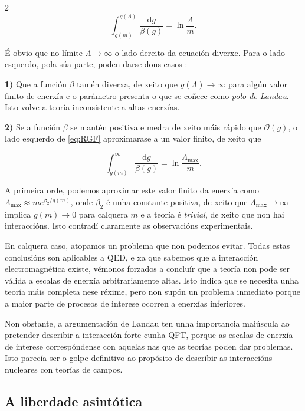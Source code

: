 \begin{multicols}{2}
\begin{equation}
    \int_{g(m)}^{g(\Lambda)} \frac{\text{d}g}{\beta(g)} = \ln \frac{\Lambda}{m}.
    \label{eq:RGF}
\end{equation}

\noindent É obvio que no límite $\Lambda \to \infty$ o lado dereito da ecuación
diverxe. Para o lado esquerdo, pola súa parte, poden darse dous casos \cite{Landau1}:

\textbf{1)} Que a función $\beta$ tamén diverxa, de xeito que $g(\Lambda) \to \infty$ para
algún valor finito de enerxía e o parámetro presenta o que se coñece como
\textit{polo de Landau}. Isto volve a teoría inconsistente a altas enerxías.

\textbf{2)} Se a función $\beta$ se mantén positiva e medra de xeito máis rápido que
$\mathcal{O}(g)$, o lado esquerdo de \eqref{eq:RGF} aproximarase a un valor
finito, de xeito que

\begin{equation}
    \int_{g(m)}^{\infty} \frac{\text{d}g}{\beta(g)} = \ln
    \frac{\Lambda_\text{max}}{m}.
\end{equation}

\noindent A primeira orde, podemos aproximar este valor finito da enerxía como $
\Lambda_\text{max} \approx m e^{\beta_2 / g(m)}$, onde $\beta_2$ é unha
constante positiva, de xeito que $\Lambda_\text{max} \to \infty$ implica $g(m)
\to 0$ para calquera $m$ e a teoría é \textit{trivial}, de xeito que non hai
interaccións. Isto contradí claramente as observacións experimentais.


En calquera caso, atopamos un problema que non podemos evitar. Todas estas
conclusións son aplicables a QED, e xa que sabemos que a interacción
electromagnética existe, vémonos forzados a concluír que a teoría non pode ser
válida a escalas de enerxía arbitrariamente altas. Isto indica que se necesita
unha teoría máis completa nese réxime, pero non supón un problema inmediato
porque a maior parte de procesos de interese ocorren a enerxías inferiores.

Non obstante, a argumentación de Landau ten unha importancia maiúscula ao
pretender describir a interacción forte cunha QFT, porque as escalas de enerxía
de interese correspóndense con aquelas nas que as teorías poden dar problemas.
Isto parecía ser o golpe definitivo ao propósito de describir as interaccións
nucleares con teorías de campos.

\subsection*{A liberdade asintótica}


\end{multicols}
